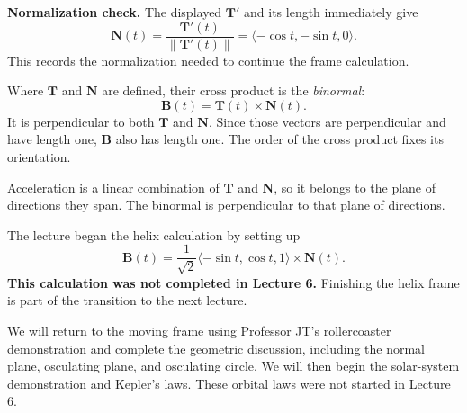 \documentclass[11pt,letterpaper]{article}
\newcommand{\T}{\mathbf T}
\newcommand{\N}{\mathbf N}
\newcommand{\B}{\mathbf B}
\newcommand{\norm}[1]{\left\lVert#1\right\rVert}
\newcommand{\heading}[1]{\vspace{5pt}{\large\bfseries #1}\par}
\newcommand{\subhead}[1]{\textbf{#1}\quad}
\begin{document}
\subhead{Normalization check.} The displayed $\T'$ and its length immediately give
\[
 \N(t)=\frac{\T'(t)}{\norm{\T'(t)}}=\langle-\cos t,-\sin t,0\rangle.
\]
This records the normalization needed to continue the frame calculation.

\heading{The binormal: introduced at the end of Lecture 6}
Where $\T$ and $\N$ are defined, their cross product is the \emph{binormal}:
\[
 \boxed{\B(t)=\T(t)\times\N(t).}
\]
It is perpendicular to both $\T$ and $\N$. Since those vectors are perpendicular and have length one, $\B$ also has length one. The order of the cross product fixes its orientation.

Acceleration is a linear combination of $\T$ and $\N$, so it belongs to the plane of directions they span. The binormal is perpendicular to that plane of directions.

The lecture began the helix calculation by setting up
\[
 \B(t)=\frac1{\sqrt2}\langle-\sin t,\cos t,1\rangle\times\N(t).
\]
\textbf{This calculation was not completed in Lecture 6.} Finishing the helix frame is part of the transition to the next lecture.

\heading{Where Lecture 7 begins}
We will return to the moving frame using Professor JT's rollercoaster demonstration and complete the geometric discussion, including the normal plane, osculating plane, and osculating circle. We will then begin the solar-system demonstration and Kepler's laws. These orbital laws were not started in Lecture 6.
\end{document}
